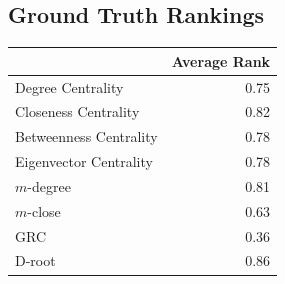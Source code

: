 \documentclass[3p,times]{elsarticle}
\begin{document}
%
%



\subsection{Ground Truth Rankings}
\begin{table}[ht]
\centering
\begin{tabular}{lr}
  \hline
 & Average Rank \\ 
  \hline
Degree Centrality & 0.75 \\ 
  Closeness Centrality & 0.82 \\ 
  Betweenness Centrality & 0.78 \\ 
  Eigenvector Centrality & 0.78 \\ 
  $m$-degree & 0.81 \\ 
  $m$-close & 0.63 \\ 
  GRC & 0.36 \\ 
  D-root & 0.86 \\ 
   \hline
\end{tabular}
\end{table}
\end{document}
